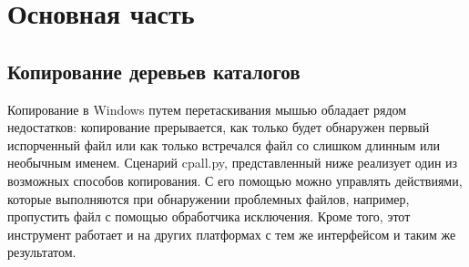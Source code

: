 \documentclass[12pt]{article}
\begin{document}
\section{Основная часть}
\subsection{Копирование деревьев каталогов}
Копирование в Windows путем перетаскивания
мышью обладает рядом недостатков: копирование прерывается,
как только будет обнаружен первый испорченный файл или как только встречался файл со слишком длинным или необычным именем. Сценарий cpall.py, представленный ниже
реализует один из возможных способов копирования. С его помощью
можно управлять действиями, которые выполняются при обнаружении проблемных файлов, например, пропустить файл с помощью обработчика исключения. Кроме того, этот инструмент работает и на других платформах с тем же интерфейсом и таким же результатом.
\end{document}
